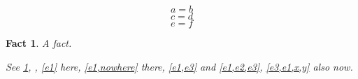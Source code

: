 \documentclass{article}
\newtheorem{fact}{Fact}
\begin{document}
\begin{equation}\label{e1}
a = b
\end{equation}
\begin{equation}\label{e2}
c = d
\end{equation}
\begin{equation}\label{e3}
e = f
\end{equation}
\begin{fact}\label{f1}
A fact.
\end{fact}
\emph{See \cref{f1}, , \cref{e1} here, \cref{e1,nowhere} there, \cref{e1,e3} and \cref{e1,e2,e3}, \cref{e3,e1,x,y} also  now.}
\end{document}
